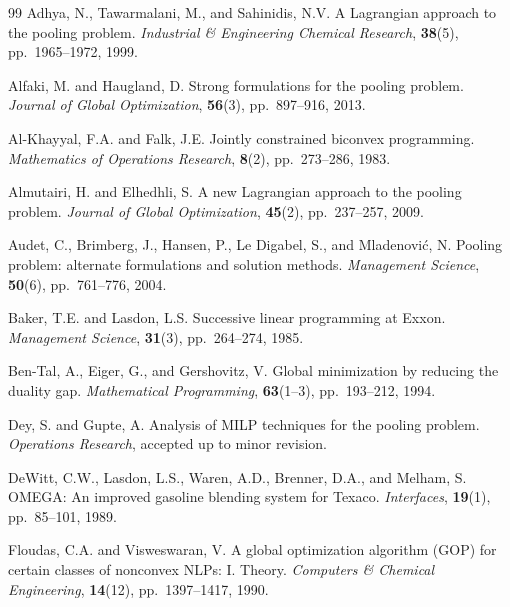 \documentclass[smallcondensed]{svjour3}
\begin{document}
\begin{thebibliography}{99}
Adhya, N., Tawarmalani, M., and Sahinidis, N.V.
\newblock A Lagrangian approach to the pooling problem.
\newblock \emph{Industrial \& Engineering Chemical Research},
\newblock \textbf{38}(5), pp.\ 1965--1972, 1999.

Alfaki, M. and Haugland, D.
\newblock Strong formulations for the pooling problem.
\newblock \emph{Journal of Global Optimization},
\newblock \textbf{56}(3), pp.\ 897--916, 2013.

Al-Khayyal, F.A. and Falk, J.E.
\newblock Jointly constrained biconvex programming. 
\newblock \emph{Mathematics of Operations Research},
\newblock \textbf{8}(2), pp.\ 273--286, 1983.

Almutairi, H. and Elhedhli, S.
\newblock A new Lagrangian approach to the pooling problem.
\newblock \emph{Journal of Global Optimization},
\newblock \textbf{45}(2), pp.\ 237--257, 2009.

Audet, C., Brimberg, J., Hansen, P., Le Digabel, S., and Mladenovi\'{c}, N.
\newblock Pooling problem: alternate formulations and solution methods. 
\newblock \emph{Management Science},
\newblock \textbf{50}(6), pp.\ 761--776, 2004.

Baker, T.E. and Lasdon, L.S.
\newblock Successive linear programming at Exxon.
\newblock \emph{Management Science},
\newblock \textbf{31}(3), pp.\ 264--274, 1985.

Ben-Tal, A., Eiger, G., and Gershovitz, V.
\newblock Global minimization by reducing the duality gap.
\newblock \emph{Mathematical Programming},
\newblock \textbf{63}(1--3), pp.\ 193--212, 1994.

Dey, S. and Gupte, A.
\newblock Analysis of MILP techniques for the pooling problem.
\newblock \emph{Operations Research}, accepted up to minor revision.

DeWitt, C.W., Lasdon, L.S., Waren, A.D., Brenner, D.A., and Melham, S.
\newblock OMEGA: An improved gasoline blending system for Texaco. 
\newblock \emph{Interfaces},
\newblock \textbf{19}(1), pp.\ 85--101, 1989.

Floudas, C.A. and Visweswaran, V.
\newblock A global optimization algorithm (GOP) for certain classes of nonconvex NLPs: I. Theory. 
\newblock \emph{Computers \& Chemical Engineering}, 
\newblock \textbf{14}(12), pp.\ 1397--1417, 1990.


\end{thebibliography}
\end{document}
